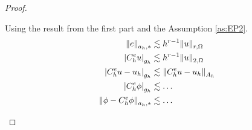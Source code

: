 \begin{proof}
\begin{enumerate}[label=\arabic*)]
Using the result from the first part and the Assumption \ref{as:EP2}.
\[
    \begin{split}
        \| e \|_{ a_{h},*  }^{  } &\lesssim h^{r-1} \| u \|_{ r, \Omega  }^{  } \\
        \left\lvert  C^{e} _{h} u  \right\rvert _{g_{h}} &\lesssim h^{r-1}\| u \|_{2,\Omega   }^{  } \\
        \left\lvert  C^{e} _{h} u - u_{h}  \right\rvert _{g_{h}} &\lesssim \|  C^{e} _{h} u - u_{h} \|_{ A_{h}  }^{  }  \\
        \left\lvert  C^{e} _{h} \phi   \right\rvert _{g_{h}} &\lesssim  \ldots \\
        \|\phi - C^{e} _{h} \phi  \|_{a_{h},*  }^{  }  &\lesssim  \ldots
    \end{split}
\]

    \end{enumerate}
\end{proof}




